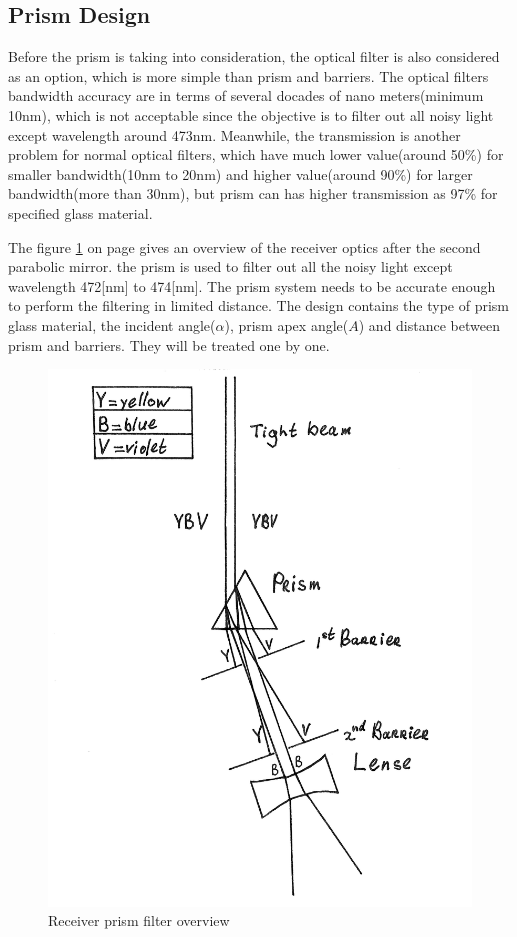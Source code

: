 \subsection{Prism Design}
\label{prism}
Before the prism is taking into consideration, the optical filter is also considered as an option, which is more simple than prism and barriers. The optical filters bandwidth accuracy are in terms of several docades of nano meters(minimum 10nm\cite{optical_filter}), which is not acceptable since the objective is to filter out all noisy light except wavelength around 473nm. Meanwhile, the transmission is another problem for normal optical filters, which have much lower value(around 50\%) for smaller bandwidth(10nm to 20nm) and higher value(around 90\%) for larger bandwidth(more than 30nm), but prism can has higher transmission as 97\% for specified glass material.

The figure \ref{fig:prism} on page \pageref{fig:prism} gives an overview of the receiver optics after the second parabolic mirror. the prism is used to filter out all the noisy light except wavelength 472[nm] to 474[nm]. The prism system needs to be accurate enough to perform the filtering in limited distance. The design contains the type of prism glass material, the incident angle($\alpha$), prism apex angle($A$) and distance between prism and barriers. They will be treated one by one.

\begin{figure}[ht!]
\centering
\includegraphics[scale = 0.6]{chapters/img/Prism.png}
\caption{Receiver prism filter overview}
\label{fig:prism}
\end{figure} 


